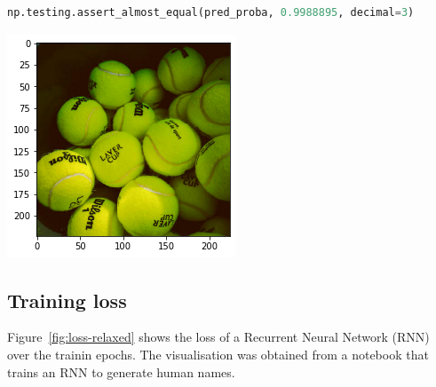 \documentclass[acmsmall,screen,review,anonymous]{acmart}
\begin{document}
\begin{minipage}{0.5\textwidth}
  \begin{lstlisting}[language=Python]
np.testing.assert_almost_equal(pred_proba, 0.9988895, decimal=3)
  \end{lstlisting}
  \label{lst:tennisball}
\end{minipage}
\begin{minipage}{0.5\textwidth}
  \includegraphics[width=\linewidth]{../catalogue/select-35b.png}
  \label{fig:tennisball}
\end{minipage}

\subsection{Training loss}

Figure~\ref{fig:loss-relaxed} shows the loss of a Recurrent Neural Network (RNN) over the trainin epochs. The visualisation was obtained from a notebook that trains an RNN to generate human names.
\end{document}
